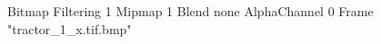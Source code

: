 {Bitmap
	{Filtering 1}
	{Mipmap 1}
	{Blend none}
	{AlphaChannel 0}
	{Frame "tractor_1_x.tif.bmp"}
}
